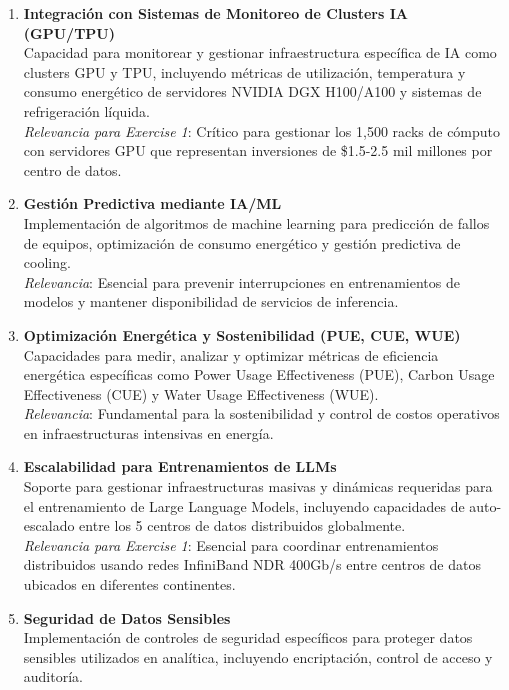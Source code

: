 \documentclass[12pt,a4paper]{article}
\begin{document}
\begin{enumerate}
    \item \textbf{Integración con Sistemas de Monitoreo de Clusters IA (GPU/TPU)}\\
    Capacidad para monitorear y gestionar infraestructura específica de IA como clusters GPU y TPU, incluyendo métricas de utilización, temperatura y consumo energético de servidores NVIDIA DGX H100/A100 y sistemas de refrigeración líquida.\\
    \textit{Relevancia para Exercise 1}: Crítico para gestionar los 1,500 racks de cómputo con servidores GPU que representan inversiones de \$1.5-2.5 mil millones por centro de datos.

    \item \textbf{Gestión Predictiva mediante IA/ML}\\
    Implementación de algoritmos de machine learning para predicción de fallos de equipos, optimización de consumo energético y gestión predictiva de cooling.\\
    \textit{Relevancia}: Esencial para prevenir interrupciones en entrenamientos de modelos y mantener disponibilidad de servicios de inferencia.

    \item \textbf{Optimización Energética y Sostenibilidad (PUE, CUE, WUE)}\\
    Capacidades para medir, analizar y optimizar métricas de eficiencia energética específicas como Power Usage Effectiveness (PUE), Carbon Usage Effectiveness (CUE) y Water Usage Effectiveness (WUE).\\
    \textit{Relevancia}: Fundamental para la sostenibilidad y control de costos operativos en infraestructuras intensivas en energía.

    \item \textbf{Escalabilidad para Entrenamientos de LLMs}\\
    Soporte para gestionar infraestructuras masivas y dinámicas requeridas para el entrenamiento de Large Language Models, incluyendo capacidades de auto-escalado entre los 5 centros de datos distribuidos globalmente.\\
    \textit{Relevancia para Exercise 1}: Esencial para coordinar entrenamientos distribuidos usando redes InfiniBand NDR 400Gb/s entre centros de datos ubicados en diferentes continentes.

    \item \textbf{Seguridad de Datos Sensibles}\\
    Implementación de controles de seguridad específicos para proteger datos sensibles utilizados en analítica, incluyendo encriptación, control de acceso y auditoría.


\end{enumerate}
\end{document}
